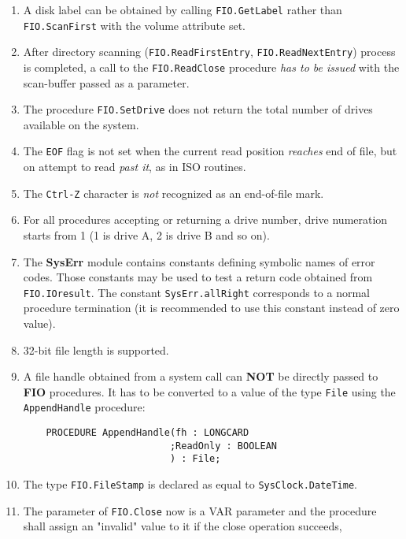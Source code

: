\begin{enumerate}
\item A disk label can be obtained by calling \verb'FIO.GetLabel' rather
      than \verb'FIO.ScanFirst' with the volume attribute set.

\item After directory scanning (\verb'FIO.ReadFirstEntry', \verb'FIO.ReadNextEntry') process
      is completed, a call to the \verb'FIO.ReadClose' procedure {\em has to be issued} with
      the scan-buffer passed as a parameter.

\item The procedure \verb'FIO.SetDrive' does not return the total number of drives
      available on the system.

\item The \verb'EOF' flag is not set when the current read position {\it reaches} end of file,
      but on attempt to read {\it past it}, as in ISO routines.

\item The \verb'Ctrl-Z' character is {\it not} recognized as an end-of-file mark.

\item For all procedures accepting or returning a drive number, drive numeration
      starts from 1 (1 is drive A, 2 is drive B and so on).

\item The {\bf SysErr} module contains constants defining symbolic names of error
      codes. Those constants may be used to test a return code obtained from
      \verb'FIO.IOresult'. The constant \verb'SysErr.allRight' corresponds to a normal
      procedure termination (it is recommended to use this constant instead of
      zero value).

\item 32-bit file length is supported.

\item A file handle obtained from a system call can {\bf NOT} be directly passed
      to {\bf FIO} procedures. It has to be converted to a value of the type \verb'File'
      using the \verb'AppendHandle' procedure:

\begin{verbatim}
    PROCEDURE AppendHandle(fh : LONGCARD
                          ;ReadOnly : BOOLEAN
                          ) : File;
\end{verbatim}

\item The type \verb'FIO.FileStamp' is declared as equal to 
      \verb'SysClock.DateTime'.

\item The parameter of \verb'FIO.Close' now is a VAR parameter and the procedure
      shall assign an "invalid" value to it if the close operation succeeds,

\end{enumerate}

